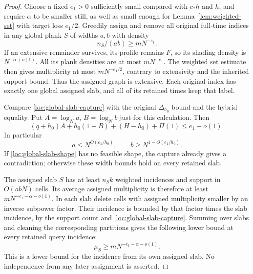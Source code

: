 \begin{proof}
Choose a fixed $e_1>0$ sufficiently small compared with $c_*h$
and $h$, and require $\alpha$ to be smaller still, as well as
small enough for Lemma~\ref{lem:weighted-set} with target loss
$e_1/2$.  Greedily assign and remove all original full-time
indices in any global plank $S$ of widths $a,b$ with density
\begin{equation}
 n_S/(ab)\geq mN^{-e_1}.
 \label{loc:global-slab-capture}
\end{equation}
If an extensive remainder survives, its profile remains $F$,
so its shading density is $N^{-\alpha+o(1)}$.  All its plank
densities are at most $mN^{-e_1}$.  The weighted set estimate
then gives multiplicity at most $mN^{-e_1/2}$, contrary to
extensivity and the inherited support bound.  Thus the assigned
graph is extensive.  Each original index has exactly one global
assigned slab, and all of its retained times keep that label.

Compare \eqref{loc:global-slab-capture} with the original
$\Delta_{h_0}$ bound and the hybrid equality.  Put
$A=\log_N a$, $B=\log_N b$ just for this calculation.  Then
\begin{equation}
 (q+h_0)A+h_0(1-B)+(H-h_0)+\Pi(1)
       \leq e_1+o(1).
 \label{loc:global-slab-shape}
\end{equation}
In particular
\[
 a\leq N^{O(e_1/h_0)},\qquad
 b\geq N^{1-O(e_1/h_0)}.
\]
If \eqref{loc:global-slab-shape} has no feasible shape, the capture
already gives a contradiction; otherwise these width bounds hold
on every retained slab.

The assigned slab $S$ has at least $n_Sk$ weighted incidences and
support in $O(abN)$ cells.  Its average assigned multiplicity is
therefore at least $mN^{-e_1-\alpha-o(1)}$.  In each slab delete
cells with assigned multiplicity smaller by an inverse subpower
factor.  Their incidence is bounded by that factor times the
slab incidence, by the support count and
\eqref{loc:global-slab-capture}.  Summing over slabs and cleaning
the corresponding partitions gives the following lower bound at
every retained query incidence:
\begin{equation}
 \mu_S\geq mN^{-e_1-\alpha-o(1)}.
 \label{loc:slab-query-mass}
\end{equation}
This is a lower bound for the incidence from its own assigned
slab.  No independence from any later assignment is asserted.


\end{proof}
